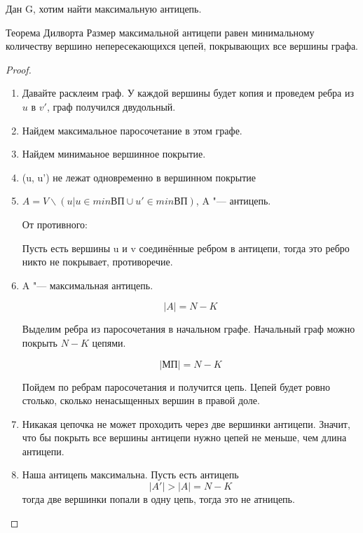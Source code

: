 Дан G, хотим найти максимальную антицепь.

\begin{theorem}{Теорема Дилворта}
Размер максимальной антицепи равен минимальному количеству вершино непересекающихся цепей, покрывающих все вершины графа.
\end{theorem}

\begin{proof}                                              
\begin{enumerate}
\item  Давайте расклеим граф. У каждой вершины будет копия и проведем ребра из $u$ в $v'$, граф получился двудольный. 
\item  Найдем максимальное паросочетание в этом графе.
\item  Найдем минимаьное вершинное покрытие. 
\item  (u, u') не лежат одновременно в вершинном покрытие
\item  $A = V \smallsetminus (u| u \in min ВП \cup u' \in min ВП)$, A "--- антицепь.

От противного:

Пусть есть вершины u и v соединённые ребром в антицепи, тогда это ребро никто не покрывает, противоречие.
\item A "--- максимальная антицепь.

$$|A| = N - K$$

Выделим ребра из паросочетания в начальном графе. Начальный граф можно покрыть $N - K$ цепями. 

$$|МП| = N - K$$ 

Пойдем по ребрам паросочетания и получится цепь. Цепей будет ровно столько, сколько ненасыщенных вершин в правой доле. 

\item Никакая цепочка не может проходить через две вершинки антицепи. Значит, что бы покрыть все вершины антицепи нужно цепей не меньше, чем 
длина антицепи.

\item Наша антицепь максимальна. Пусть есть антицепь $$|A'| > |A| = N - K$$ тогда две вершинки попали в одну цепь, тогда это не атницепь. 
\end{enumerate}
\end{proof}